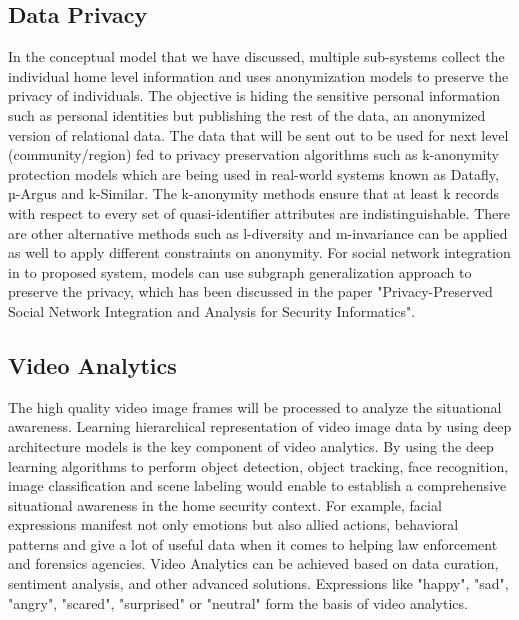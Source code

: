 \documentclass[sigconf]{acmart}
\begin{document}
\subsection{Data Privacy}
In the conceptual model that we have discussed, multiple sub-systems collect the individual home level information and uses anonymization models to preserve the privacy of individuals. The objective is hiding the sensitive personal information such as personal identities but publishing the rest of the data, an anonymized version of relational data. The data that will be sent out to be used for next level (community/region) fed to privacy preservation algorithms such as k-anonymity protection models which are being used in real-world systems known as Datafly, µ-Argus and k-Similar. The k-anonymity methods ensure that at least k records with respect to every set of quasi-identifier attributes are indistinguishable. There are other alternative methods such as l-diversity and m-invariance can be applied as well to apply different constraints on anonymity. For social network integration in to proposed system, models can use subgraph generalization approach to preserve the privacy, which has been discussed in the paper "Privacy-Preserved Social Network Integration and Analysis for Security Informatics"\cite{Yang2010}.

\subsection{Video Analytics}
The high quality video image frames will be processed to analyze the situational awareness. Learning hierarchical representation of video image data by using deep architecture models is the key component of video analytics. By using the deep learning algorithms to perform object detection, object tracking, face recognition, image classification and scene labeling would enable to establish a comprehensive situational awareness in the home security context. For example, facial expressions manifest not only emotions but also allied actions, behavioral patterns and give a lot of useful data when it comes to helping law enforcement and forensics agencies. Video Analytics can be achieved based on data curation, sentiment analysis, and other advanced solutions. Expressions like "happy", "sad", "angry", "scared", "surprised" or "neutral" form the basis of video analytics.
\end{document}
